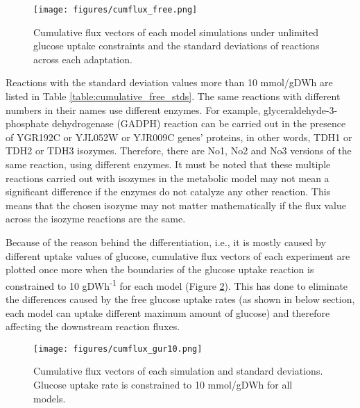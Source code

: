 \begin{figure}[H]
  \begin{center}
  \texttt{[image: figures/cumflux\_free.png]}
  \caption[Cumulative flux vectors of each model simulations under unlimited glucose uptake constraints and the standard deviations of reactions across each adaptation]{Cumulative flux vectors of each model simulations under unlimited glucose uptake constraints and the standard deviations of reactions across each adaptation.}
  \label{fig:cumflux_free}
  \end{center}
\end{figure}

Reactions with the standard deviation values more than 10 mmol/gDWh are listed in Table \ref{table:cumulative_free_stds}. The same reactions with different numbers in their names use different enzymes. For example, glyceraldehyde-3-phosphate dehydrogenase (GADPH) reaction can be carried out in the presence of YGR192C or YJL052W or YJR009C genes' proteins, in other words, TDH1 or TDH2 or TDH3 isozymes. Therefore, there are No1, No2 and No3 versions of the same reaction, using different enzymes. It must be noted that these multiple reactions carried out with isozymes in the metabolic model may not mean a significant difference if the enzymes do not catalyze any other reaction. This means that the chosen isozyme may not matter mathematically if the flux value across the isozyme reactions are the same.


Because of the reason behind the differentiation, i.e., it is mostly caused by different uptake values of glucose, cumulative flux vectors of each experiment are plotted once more when the boundaries of the glucose uptake reaction is constrained to 10 gDWh\textsuperscript{-1} for each model (Figure \ref{fig:cumflux_gur10}). This has done to eliminate the differences caused by the free glucose uptake rates (as shown in below section, each model can uptake different maximum amount of glucose) and therefore affecting the downstream reaction fluxes.

\begin{figure}[H]
  \begin{center}
  \texttt{[image: figures/cumflux\_gur10.png]}
  \caption[Cumulative flux vectors of each experiment when glucose uptake rate is constrained]{Cumulative flux vectors of each simulation and standard deviations. Glucose uptake rate is constrained to 10 mmol/gDWh for all models. }
  \label{fig:cumflux_gur10}
  \end{center}
\end{figure}

